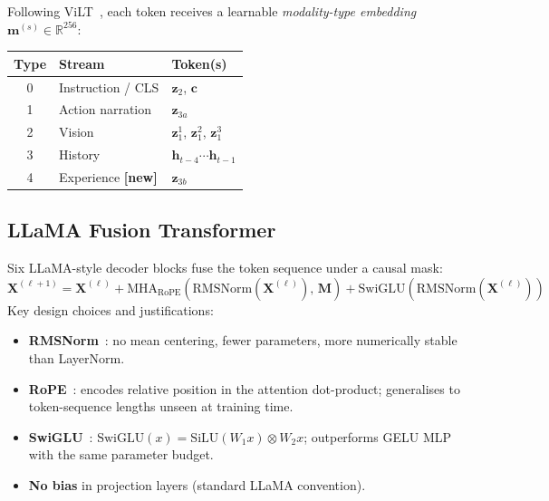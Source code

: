 \documentclass{article}
\begin{document}
Following ViLT~\citep{kim2021vilt}, each token receives a learnable
\emph{modality-type embedding} $\mathbf{m}^{(s)}\!\in\!\mathbb{R}^{256}$:

\begin{center}
\small
\begin{tabular}{cll}
\toprule
Type & Stream & Token(s) \\
\midrule
0 & Instruction / CLS & $\mathbf{z}_2$, $\mathbf{c}$ \\
1 & Action narration & $\mathbf{z}_{3a}$ \\
2 & Vision & $\mathbf{z}_1^1$, $\mathbf{z}_1^2$, $\mathbf{z}_1^3$ \\
3 & History & $\mathbf{h}_{t-4}\!\cdots\!\mathbf{h}_{t-1}$ \\
4 & Experience \textcolor{NewOrange}{\textbf{[new]}} & $\mathbf{z}_{3b}$ \\
\bottomrule
\end{tabular}
\end{center}

\subsection{LLaMA Fusion Transformer}
\label{sec:fusion}

Six LLaMA-style decoder blocks fuse the token sequence under a causal mask:
\begin{equation}
  \mathbf{X}^{(\ell+1)}
  = \mathbf{X}^{(\ell)}
  + \mathrm{MHA}_{\mathrm{RoPE}}\!\left(\mathrm{RMSNorm}(\mathbf{X}^{(\ell)}),\,\mathbf{M}\right)
  + \mathrm{SwiGLU}\!\left(\mathrm{RMSNorm}(\mathbf{X}^{(\ell)})\right)
  \label{eq:llama}
\end{equation}
Key design choices and justifications:

\begin{itemize}[leftmargin=1.5em,itemsep=1pt]
  \item \textbf{RMSNorm}~\citep{zhang2019rmsnorm}: no mean centering, fewer
        parameters, more numerically stable than LayerNorm.
  \item \textbf{RoPE}~\citep{su2021rope}: encodes relative position in the
        attention dot-product; generalises to token-sequence lengths unseen
        at training time.
  \item \textbf{SwiGLU}~\citep{shazeer2020swiglu}:
        $\mathrm{SwiGLU}(x)=\mathrm{SiLU}(W_1 x)\otimes W_2 x$;
        outperforms GELU MLP with the same parameter budget.
  \item \textbf{No bias} in projection layers (standard LLaMA convention).
\end{itemize}
\end{document}
